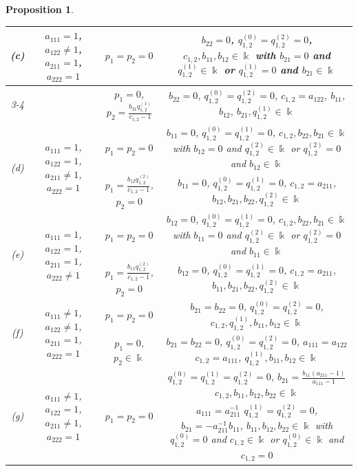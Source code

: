 \documentclass{amsart}
\newtheorem{proposition}[theorem]{Proposition}
\theoremstyle{definition}
\theoremstyle{remark}
\numberwithin{equation}{section}
\begin{document}
\begin{proposition}
\begin{table}[h]
\begin{center}
{\begin{tabular}{ |c|c|c|c| }
\hline
\multirow{2}{*}{{\rm (c)}} & \multirow{2}{*}{$a_{111}= 1$, $a_{122}\not=1$, $a_{211}=1$, $a_{222}=1$}  & $p_1=p_2=0$ & $b_{22}=0$, $q_{1,2}^{(0)}=q_{1,2}^{(2)}=0$, $c_{1,2}, b_{11}, b_{12}\in\Bbbk$ {\rm with} $b_{21}=0$ and $q_{1,2}^{(1)} \in \Bbbk$ or $q_{1,2}^{(1)}=0$ and $b_{21}\in\Bbbk$ \\ \cline{3-4}
&  & $p_1=0$, $p_2=\frac{b_{21}q_{1,2}^{(1)}}{c_{1,2}-1}$ & $b_{22}=0$, $q_{1,2}^{(0)}=q_{1,2}^{(2)}=0$, $c_{1,2}=a_{122}$, $b_{11}$, $b_{12}$, $b_{21}, q_{1,2}^{(1)}\in\Bbbk$ \\   
\hline
\multirow{2}{*}{{\rm (d)}} & \multirow{2}{*}{$a_{111}= 1$, $a_{122}=1$, $a_{211}\not=1$, $a_{222}=1$}  & $p_1=p_2=0$ & $b_{11}=0$, $q_{1,2}^{(0)}=q_{1,2}^{(1)}=0$, $c_{1,2}, b_{22}, b_{21}\in\Bbbk$ {\rm with} $b_{12}=0$ and $q_{1,2}^{(2)} \in \Bbbk$ or $q_{1,2}^{(2)}=0$ and $b_{12}\in\Bbbk$ \\ \cline{3-4}
&  & $p_1=\frac{b_{12}q_{1,2}^{(2)}}{c_{1,2}-1}$, $p_2=0$ & $b_{11}=0$, $q_{1,2}^{(0)}=q_{1,2}^{(1)}=0$, $c_{1,2}=a_{211}$, $b_{12}, b_{21}, b_{22}, q_{1,2}^{(2)}\in\Bbbk$ \\   
\hline
\multirow{2}{*}{{\rm (e)}} & \multirow{2}{*}{$a_{111}= 1$, $a_{122}=1$, $a_{211}=1$, $a_{222}\not=1$}  & $p_1=p_2=0$ & $b_{12}=0$, $q_{1,2}^{(0)}=q_{1,2}^{(1)}=0$, $c_{1,2}, b_{22}, b_{21}\in\Bbbk$ {\rm with} $b_{11}=0$ and $q_{1,2}^{(2)} \in \Bbbk$ or $q_{1,2}^{(2)}=0$ and $b_{11}\in\Bbbk$ \\ \cline{3-4}
&  & $p_1=\frac{b_{11}q_{1,2}^{(2)}}{c_{1,2}-1}$, $p_2=0$ & $b_{12}=0$, $q_{1,2}^{(0)}=q_{1,2}^{(1)}=0$, $c_{1,2}=a_{211}$, $b_{11}, b_{21}, b_{22}, q_{1,2}^{(2)}\in\Bbbk$ \\   
\hline
\multirow{2}{*}{{\rm (f)}} & \multirow{2}{*}{$a_{111}\not =1$, $a_{122}\not=1$, $a_{211}=1$, $a_{222}=1$} & $p_1=p_2=0$ & $b_{21}=b_{22}=0$, $q_{1,2}^{(0)}=q_{1,2}^{(2)}=0$, $c_{1,2}, q_{1,2}^{(1)}, b_{11}, b_{12}\in\Bbbk$ \\ \cline{3-4}
&  & $p_1=0$, $p_2\in \Bbbk$ & $b_{21}=b_{22}=0$, $q_{1,2}^{(0)}=q_{1,2}^{(2)}=0$, $a_{111}=a_{122}$ $c_{1,2}=a_{111}$, $q_{1,2}^{(1)}, b_{11}, b_{12}\in\Bbbk$ \\   
\hline
\multirow{2}{*}{{\rm (g)}} & \multirow{2}{*}{$a_{111}\not =1$, $a_{122}=1$, $a_{211}\not=1$, $a_{222}=1$} & \multirow{2}{*}{$p_1=p_2=0$} & $q_{1,2}^{(0)}=q_{1,2}^{(1)}=q_{1,2}^{(2)}=0$, $b_{21}=\frac{b_{11}(a_{211}-1)}{a_{111}-1}$ $c_{1,2}, b_{11}, b_{12}, b_{22}\in\Bbbk$ \\ \cline{4-4}
&  &  & $a_{111}=a_{211}^{-1}$ $q_{1,2}^{(1)}=q_{1,2}^{(2)}=0$, $b_{21}=-a_{211}^{-1}b_{11}$, $b_{11}, b_{12}, b_{22}\in\Bbbk$ {\rm with} $q_{1,2}^{(0)}=0$ and $c_{1,2}\in\Bbbk$ or $q_{1,2}^{(0)}\in\Bbbk$ and $c_{1,2}=0$ \\   

\end{tabular}}
\end{center}
\end{table}
\end{proposition}
\end{document}
